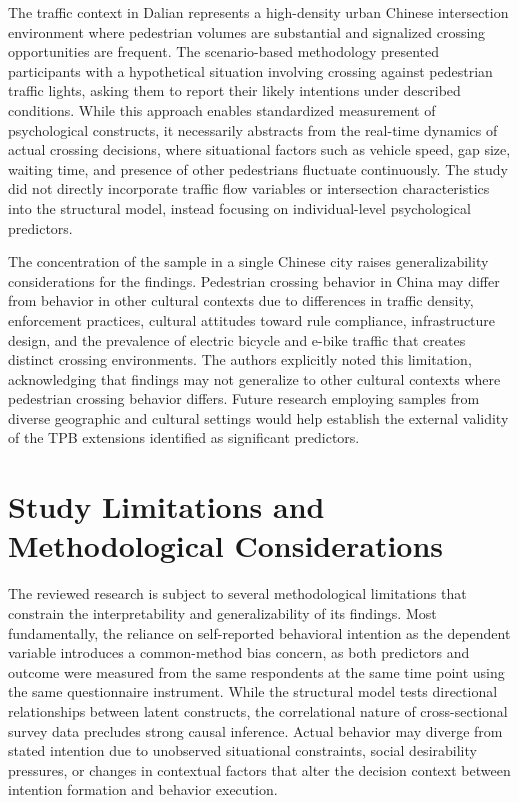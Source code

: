 \documentclass{article}
\begin{document}
The traffic context in Dalian represents a high-density urban Chinese intersection environment where pedestrian volumes are substantial and signalized crossing opportunities are frequent. The scenario-based methodology presented participants with a hypothetical situation involving crossing against pedestrian traffic lights, asking them to report their likely intentions under described conditions. While this approach enables standardized measurement of psychological constructs, it necessarily abstracts from the real-time dynamics of actual crossing decisions, where situational factors such as vehicle speed, gap size, waiting time, and presence of other pedestrians fluctuate continuously. The study did not directly incorporate traffic flow variables or intersection characteristics into the structural model, instead focusing on individual-level psychological predictors. \cite{08_2016_zhou_aap}

The concentration of the sample in a single Chinese city raises generalizability considerations for the findings. Pedestrian crossing behavior in China may differ from behavior in other cultural contexts due to differences in traffic density, enforcement practices, cultural attitudes toward rule compliance, infrastructure design, and the prevalence of electric bicycle and e-bike traffic that creates distinct crossing environments. The authors explicitly noted this limitation, acknowledging that findings may not generalize to other cultural contexts where pedestrian crossing behavior differs. Future research employing samples from diverse geographic and cultural settings would help establish the external validity of the TPB extensions identified as significant predictors. \cite{08_2016_zhou_aap}

\section{Study Limitations and Methodological Considerations}
The reviewed research is subject to several methodological limitations that constrain the interpretability and generalizability of its findings. Most fundamentally, the reliance on self-reported behavioral intention as the dependent variable introduces a common-method bias concern, as both predictors and outcome were measured from the same respondents at the same time point using the same questionnaire instrument. While the structural model tests directional relationships between latent constructs, the correlational nature of cross-sectional survey data precludes strong causal inference. Actual behavior may diverge from stated intention due to unobserved situational constraints, social desirability pressures, or changes in contextual factors that alter the decision context between intention formation and behavior execution. \cite{08_2016_zhou_aap}
\end{document}
